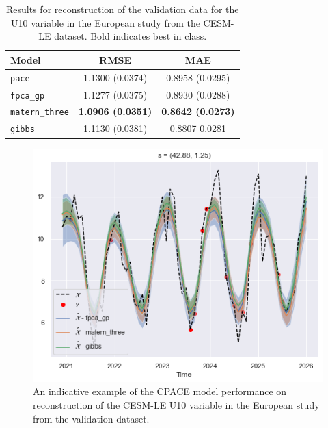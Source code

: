 \begin{table}
	\caption[Results for U10 variable on validation data in the European study]{Results for reconstruction of the validation data for the U10 variable in the European study from the CESM-LE dataset. Bold indicates best in class.}
	\centering
	\label{tab:train_cesm_u10_eur}
	\begin{tabular}{lcc}
		\toprule
		\textbf{Model} & \textbf{RMSE} & \textbf{MAE} \\
		\midrule
		\verb*|pace| & 1.1300 (0.0374) & 0.8958	(0.0295) \\
		\verb*|fpca_gp| & 1.1277 (0.0375) & 0.8930 (0.0288) \\
		\verb*|matern_three| & \textbf{1.0906 (0.0351)} & \textbf{0.8642 (0.0273)}\\
		\verb*|gibbs| & 1.1130 (0.0381) & 0.8807	0.0281\\
		\bottomrule
	\end{tabular}
\end{table}

\begin{figure}
	\centering
	\includegraphics[width=\textwidth]{train_ex_u10_eur}
	\caption{An indicative example of the CPACE model performance on reconstruction of the CESM-LE U10 variable in the European study from the validation dataset.}
	\label{fig:train_ex_u10_eur}
\end{figure}

